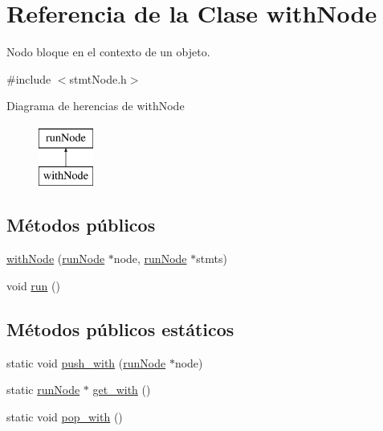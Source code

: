\hypertarget{classwithNode}{\section{Referencia de la Clase with\-Node}
\label{classwithNode}
}


Nodo bloque en el contexto de un objeto.  




{\ttfamily \#include $<$stmt\-Node.\-h$>$}

Diagrama de herencias de with\-Node\begin{figure}[H]
\begin{center}
\leavevmode
\includegraphics[height=2.000000cm]{classwithNode}
\end{center}
\end{figure}
\subsection*{Métodos públicos}
\begin{DoxyCompactItemize}
\item 
\hyperlink{classwithNode_a7a84072f945d194f5e42c37bf56a4e67}{with\-Node} (\hyperlink{classrunNode}{run\-Node} $\ast$node, \hyperlink{classrunNode}{run\-Node} $\ast$stmts)
\item 
void \hyperlink{classwithNode_afc545ad8ecb12e04bdaecbeccf5e8156}{run} ()
\end{DoxyCompactItemize}
\subsection*{Métodos públicos estáticos}
\begin{DoxyCompactItemize}
\item 
static void \hyperlink{classwithNode_a074088b10e8b697ea53e91fdcada39e3}{push\-\_\-with} (\hyperlink{classrunNode}{run\-Node} $\ast$node)
\item 
static \hyperlink{classrunNode}{run\-Node} $\ast$ \hyperlink{classwithNode_a9a9cf83e58a35c019fefa10479841aa2}{get\-\_\-with} ()
\item 
static void \hyperlink{classwithNode_a039c978c8546a2b4fc14c9af72ca3987}{pop\-\_\-with} ()
\end{DoxyCompactItemize}


